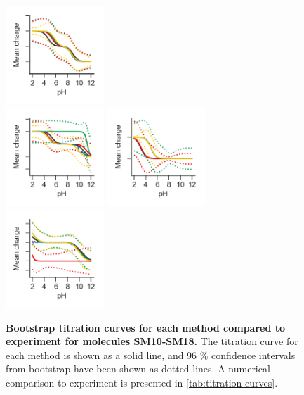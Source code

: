 \documentclass[9pt,lineno,final]{elife}
\begin{document}
\begin{figure}[H]
	\includegraphics[width=0.33\textwidth]{Reports/overview-virtual-titration-SM15.png}	 \\
	\includegraphics[width=0.33\textwidth]{Reports/overview-virtual-titration-SM16.png}
	\includegraphics[width=0.33\textwidth]{Reports/overview-virtual-titration-SM17.png}
	\includegraphics[width=0.33\textwidth]{Reports/overview-virtual-titration-SM18.png}	 \\
	\caption{{\bf Bootstrap titration curves for each method compared to experiment for molecules SM10-SM18.} The titration curve for each method is shown as a solid line, and 96 \% confidence intervals from bootstrap have been shown as dotted lines. A numerical comparison to experiment is presented in \cref{tab:titration-curves}.
	\label{fig:charge-curves2}}

\end{figure}
    
\end{document}
